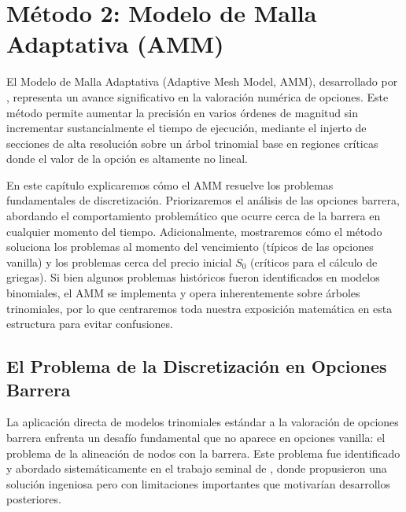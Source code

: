 \chapter{Método 2: Modelo de Malla Adaptativa (AMM)}
\label{chapter:metodo_arboles_mallas}

El Modelo de Malla Adaptativa (Adaptive Mesh Model, AMM), desarrollado por \cite{figlewski1999adaptive}, representa un avance significativo en la valoración numérica de opciones. Este método permite aumentar la precisión en varios órdenes de magnitud sin incrementar sustancialmente el tiempo de ejecución, mediante el injerto de secciones de alta resolución sobre un árbol trinomial base en regiones críticas donde el valor de la opción es altamente no lineal.

En este capítulo explicaremos cómo el AMM resuelve los problemas fundamentales de discretización. Priorizaremos el análisis de las opciones barrera, abordando el comportamiento problemático que ocurre cerca de la barrera en cualquier momento del tiempo. Adicionalmente, mostraremos cómo el método soluciona los problemas al momento del vencimiento (típicos de las opciones vanilla) y los problemas cerca del precio inicial $S_0$ (críticos para el cálculo de griegas). Si bien algunos problemas históricos fueron identificados en modelos binomiales, el AMM se implementa y opera inherentemente sobre árboles trinomiales, por lo que centraremos toda nuestra exposición matemática en esta estructura para evitar confusiones.

\section{El Problema de la Discretización en Opciones Barrera}

La aplicación directa de modelos trinomiales estándar a la valoración de opciones barrera enfrenta un desafío fundamental que no aparece en opciones vanilla: el problema de la alineación de nodos con la barrera. Este problema fue identificado y abordado sistemáticamente en el trabajo seminal de \cite{boyle1994bumping}, donde propusieron una solución ingeniosa pero con limitaciones importantes que motivarían desarrollos posteriores.

